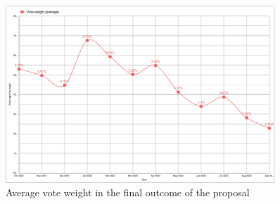 \documentclass[MSE,Master,english]{twbook}%
\begin{document}
\begin{figure}[H]
  \centering
  \includegraphics[width=0.9\textwidth]{metrics/vote_weight.png}
  \caption{Average vote weight in the final outcome of the proposal}
  \label{fig:vote_weight}
\end{figure}
\end{document}
